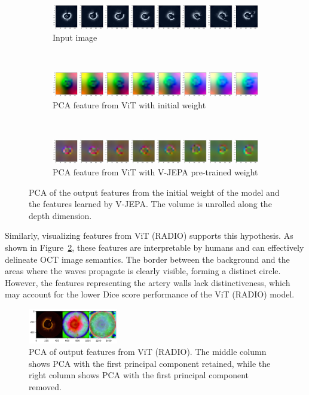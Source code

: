 \documentclass[a4paper,11pt,oneside]{report}
\begin{document}
\begin{figure}[hbt]
    \centering
    \begin{subfigure}[t]{0.8\textwidth}
        \centering
        \includegraphics[width=0.9\linewidth]{figures/discussion_visual_vjepa_input.jpg}
        \caption{Input image}
    \end{subfigure}\\
    \begin{subfigure}[t]{0.8\textwidth}
        \centering
        \includegraphics[width=0.9\linewidth]{figures/discussion_visual_vjepa_initial.jpg}
        \caption{PCA feature from ViT with initial weight}
    \end{subfigure}\\
    \begin{subfigure}[t]{0.8\textwidth}
        \centering
        \includegraphics[width=0.9\linewidth]{figures/discussion_visual_vjepa_pretrained.jpg}
        \caption{PCA feature from ViT with V-JEPA pre-trained weight}
    \end{subfigure}
    \caption{PCA of the output features from the initial weight of the model and the features learned by V-JEPA. The volume is unrolled along the depth dimension.}
    \label{fig:visually-good-features}
\end{figure}

 Similarly, visualizing features from ViT (RADIO) supports this hypothesis. As shown in Figure~\ref{fig:radio-features}, these features are interpretable by humans and can effectively delineate OCT image semantics. The border between the background and the areas where the waves propagate is clearly visible, forming a distinct circle. However, the features representing the artery walls lack distinctiveness, which may account for the lower Dice score performance of the ViT (RADIO) model.

\begin{figure}[hbt]
    \centering
    \includegraphics[width=0.35\textwidth]{figures/discussion_radio_feature.png}
    \caption{PCA of output features from ViT (RADIO). The middle column shows PCA with the first principal component retained, while the right column shows PCA with the first principal component removed.}
    \label{fig:radio-features}
\end{figure}
\end{document}
